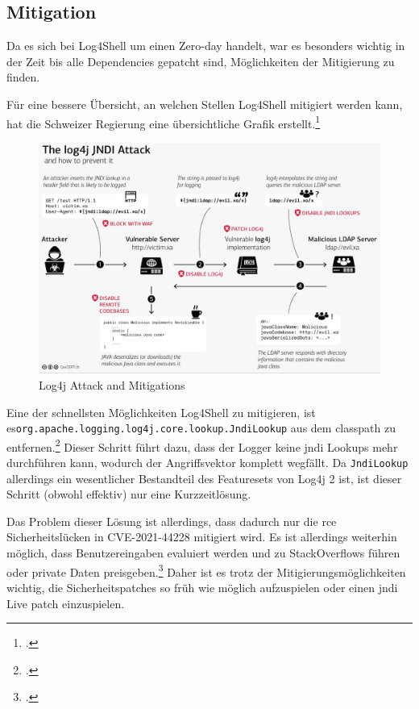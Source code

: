 
\clearpage
\subsection{Mitigation}\label{subsec:mitigation}
Da es sich bei Log4Shell um einen Zero-day handelt, war es besonders wichtig in der Zeit bis alle Dependencies gepatcht sind, Möglichkeiten der Mitigierung zu finden.

Für eine bessere Übersicht, an welchen Stellen Log4Shell mitigiert werden kann, hat die Schweizer Regierung eine übersichtliche Grafik erstellt.\footcite{schweizGov}

\begin{figure}[!htb]\label{fig:log4jattackgraphic}
    \begin{center}
        \includegraphics[width=\textwidth]{images/log4j_attack}
    \end{center}
    \caption{Log4j Attack and Mitigations}
\end{figure}

Eine der schnellsten Möglichkeiten Log4Shell zu mitigieren, ist es\newline \verb|org.apache.logging.log4j.core.lookup.JndiLookup|\newline
aus dem classpath zu entfernen.\footcite{redditThread}
Dieser Schritt führt dazu, dass der Logger keine \gls{jndi} Lookups mehr durchführen kann, wodurch der Angriffsvektor komplett wegfällt.
Da \verb|JndiLookup| allerdings ein wesentlicher Bestandteil des Featuresets von Log4j 2 ist, ist dieser Schritt (obwohl effektiv) nur eine Kurzzeitlösung.

Das Problem dieser Lösung ist allerdings, dass dadurch nur die \gls{rce} Sicherheitslücken in CVE-2021-44228 mitigiert wird.
Es ist allerdings weiterhin möglich, dass Benutzereingaben evaluiert werden und zu StackOverflows führen oder private Daten preisgeben.\footcite{log4jSecurity}
Daher ist es trotz der Mitigierungsmöglichkeiten wichtig, die Sicherheitspatches so früh wie möglich aufzuspielen oder einen \gls{jndi} Live patch einzuspielen.
